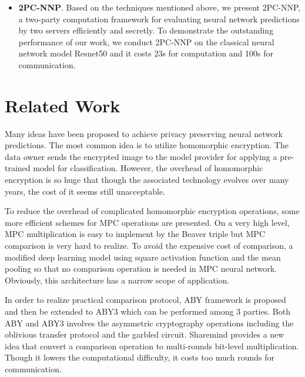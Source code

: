 \documentclass[letterpaper]{article} %
\begin{document}
\begin{itemize}


        \item \textbf{2PC-NNP}.
        Based on the techniques mentioned above,
        we present 2PC-NNP, a two-party computation framework
        for evaluating neural network predictions by two servers efficiently and secretly.
        To demonstrate the outstanding performance of our work,
        we conduct 2PC-NNP on the classical neural network model Resnet50 and
        it costs 23s for computation and 100s for communication.

    \end{itemize}






\section{Related Work}


    Many ideas have been proposed to achieve privacy preserving neural network predictions.
    The most common idea is to utilize homomorphic encryption.
    The data owner sends the encrypted image to the model provider for applying a pre-trained model for classification.
    However, the overhead of homomorphic encryption is so huge that though
    the associated technology evolves over many years\cite{ObliviousNeuralNetwork}, the cost of it seems still unacceptable.

    To reduce the overhead of complicated homomorphic encryption operations,
    some more efficient schemes for MPC operations are presented.
    On a very high level, MPC multiplication is easy to implement by the Beaver triple \cite{EfficientMultipartyProtocols}
    but MPC comparison is very hard to realize.
    To avoid the expensive cost of comparison,
    a modified deep learning model \cite{CryptoNets} using square activation function and the mean pooling so that
    no comparison operation is needed in MPC neural network.
    Obviously, this architecture has a narrow scope of application.

    In order to realize practical comparison protocol, ABY framework \cite{ABY} is proposed
    and then be extended to ABY3 \cite{ABY3} which can be performed among 3 parties.
    Both ABY and ABY3 involves the asymmetric cryptography operations
    including the oblivious transfer protocol and the garbled circuit.
    Sharemind provides a new idea that convert a comparison operation to
    multi-rounds bit-level multiplication.
    Though it lowers the computational difficulty, it costs too much rounds for
    communication.
\end{document}
